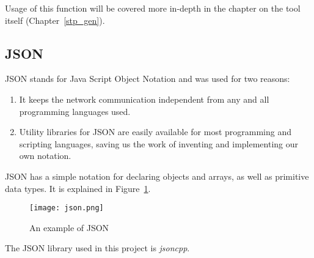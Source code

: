 Usage of this function will be covered more in-depth in the chapter on the tool itself (Chapter~\ref{stp_gen}).
\subsection{JSON}
JSON stands for Java Script Object Notation and was used for two reasons:
\begin{enumerate}
    \item It keeps the network communication independent from any and all programming languages used.
    \item Utility libraries for JSON are easily available for most programming and scripting languages, saving us the work of inventing and implementing our own notation.
\end{enumerate}
JSON has a simple notation for declaring objects and arrays, as well as primitive data types.
It is explained in Figure~\ref{fig:json}.

\begin{figure}[h]
    \centering
    \texttt{[image: json.png]}
    \caption{An example of JSON}
    \label{fig:json}
\end{figure}

The JSON library used in this project is \textit{jsoncpp}\cite{jsoncpp}.
